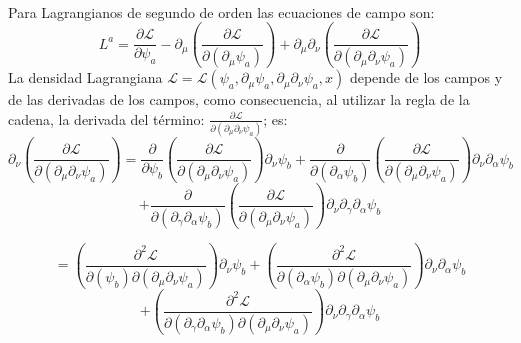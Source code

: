 \documentclass[a4paper,12pt]{article}
\begin{document}
\\

Para Lagrangianos de segundo de orden las ecuaciones de campo son:
\begin{equation}
L^a=\frac{\partial\mathscr{L} }{\partial \psi_a}-\partial_{\mu}\left(\frac{\partial\mathscr{L} }{\partial(\partial_{\mu} \psi_a)}\right)+\partial_{\mu}\partial_{\nu}\left(\frac{\partial\mathscr{L} }{\partial(\partial_{\mu}\partial_{\nu} \psi_a)}\right) 
\end{equation}
La densidad Lagrangiana  $\mathscr{L}=\mathscr{L}(\psi_a,\partial_\mu\psi_a,\partial_\mu\partial_\nu\psi_a,x)$ depende de los campos y de las derivadas de los campos, como consecuencia, al utilizar la regla de la cadena, la derivada del término: $\frac{\partial\mathscr{L} }{\partial(\partial_{\mu}\partial_{\nu} \psi_a)}$; es:
\begin{equation}
\partial_{\nu}\left(\frac{\partial\mathscr{L} }{\partial(\partial_{\mu}\partial_{\nu} \psi_a)}\right) =\frac{\partial}{\partial \psi_b} \left(\frac{\partial\mathscr{L} }{\partial(\partial_{\mu}\partial_{\nu} \psi_a)}\right)\partial_\nu\psi_b+\frac{\partial}{\partial( \partial_\alpha\psi_b)} \left(\frac{\partial\mathscr{L} }{\partial(\partial_{\mu}\partial_{\nu} \psi_a)}\right)\partial_\nu\partial_\alpha\psi_b
\end{equation}
$$+\frac{\partial}{\partial( \partial_\gamma\partial_\alpha\psi_b)} \left(\frac{\partial\mathscr{L} }{\partial(\partial_{\mu}\partial_{\nu} \psi_a)}\right)\partial_\nu\partial_\gamma\partial_\alpha\psi_b$$
\vspace{0,1cm}

\begin{equation}
=\left(\frac{\partial^2\mathscr{L} }{\partial (\psi_b)\partial(\partial_{\mu}\partial_{\nu} \psi_a)}\right)\partial_\nu\psi_b+ \left(\frac{\partial^2\mathscr{L} }{\partial( \partial_\alpha\psi_b)\partial(\partial_{\mu}\partial_{\nu} \psi_a)}\right)\partial_\nu\partial_\alpha\psi_b
\end{equation}
$$+\left(\frac{\partial^2\mathscr{L} }{\partial( \partial_\gamma\partial_\alpha\psi_b)\partial(\partial_{\mu}\partial_{\nu} \psi_a)}\right)\partial_\nu\partial_\gamma\partial_\alpha\psi_b$$
\vspace{0,1cm}
\end{document}
